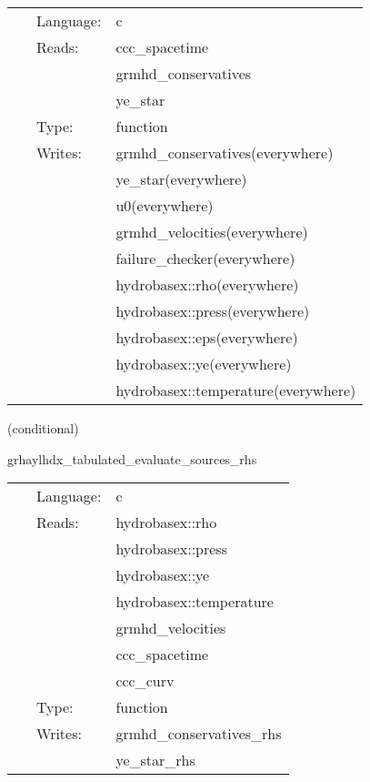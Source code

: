 \hspace{5mm}

 \begin{tabular*}{160mm}{cll} 
~ & Language:  & c \\ 
~ & Reads:  & ccc\_spacetime \\ 
~& ~ &grmhd\_conservatives\\ 
~& ~ &ye\_star\\ 
~ & Type:  & function \\ 
~ & Writes:  & grmhd\_conservatives(everywhere) \\ 
~& ~ &ye\_star(everywhere)\\ 
~& ~ &u0(everywhere)\\ 
~& ~ &grmhd\_velocities(everywhere)\\ 
~& ~ &failure\_checker(everywhere)\\ 
~& ~ &hydrobasex::rho(everywhere)\\ 
~& ~ &hydrobasex::press(everywhere)\\ 
~& ~ &hydrobasex::eps(everywhere)\\ 
~& ~ &hydrobasex::ye(everywhere)\\ 
~& ~ &hydrobasex::temperature(everywhere)\\ 
\end{tabular*} 


\vspace{5mm}

   (conditional) 

\hspace{5mm} grhaylhdx\_tabulated\_evaluate\_sources\_rhs 

\hspace{5mm}{\it tabulated version of grhaylhdx\_evaluate\_sources\_rhs } 


\hspace{5mm}

 \begin{tabular*}{160mm}{cll} 
~ & Language:  & c \\ 
~ & Reads:  & hydrobasex::rho \\ 
~& ~ &hydrobasex::press\\ 
~& ~ &hydrobasex::ye\\ 
~& ~ &hydrobasex::temperature\\ 
~& ~ &grmhd\_velocities\\ 
~& ~ &ccc\_spacetime\\ 
~& ~ &ccc\_curv\\ 
~ & Type:  & function \\ 
~ & Writes:  & grmhd\_conservatives\_rhs \\ 
~& ~ &ye\_star\_rhs\\ 
\end{tabular*} 


